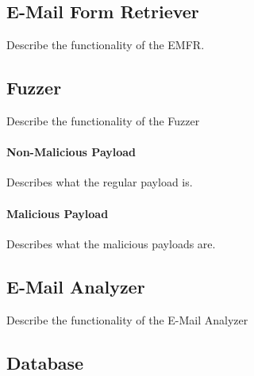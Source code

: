 \subsection{E-Mail Form Retriever}
	\label{Comp:EMFR}
	Describe the functionality of the EMFR.
		
\subsection{Fuzzer}
	\label{Comp:Fuzzer}
	Describe the functionality of the Fuzzer
	\paragraph{Non-Malicious Payload}
		\label{Comp:Fuzzer:nmp}
		Describes what the regular payload is.
		
	\paragraph{Malicious Payload}
		\label{Comp:Fuzzer:mp}
		Describes what the malicious payloads are.
		
\subsection{E-Mail Analyzer}
	\label{Comp:EMA}
	Describe the functionality of the E-Mail Analyzer
	
\subsection{Database}
